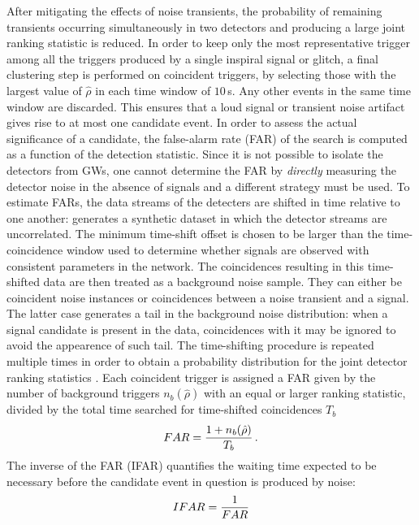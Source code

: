 \documentclass[binding=0.6cm, LaM]{sapthesis}
\begin{document}
	After mitigating the effects of noise transients, the probability of remaining transients 
	occurring simultaneously in two detectors and producing a large joint 
	ranking statistic is reduced.
	In order to keep only the most representative trigger among all the triggers produced by a single inspiral signal or glitch, 
	a final clustering step is performed on coincident triggers, 
	by selecting those with the largest value of $\hat \rho$ 
	in each time window of $10$\,s. 
	Any other events in the same time window are discarded. 
	This ensures that a loud signal or transient noise artifact gives rise to at most one candidate event.
	In order to assess the actual significance of a candidate, 
	the false-alarm rate (FAR) of the search is computed as a function of the detection statistic.
  	Since it is not possible to isolate the detectors from GWs, 
	one cannot determine the FAR by \emph{directly} measuring the detector noise in the absence of signals and a different strategy must be used.
 	To estimate FARs, the data streams of the detecters are shifted in time relative to one another: generates a synthetic dataset in which the detector streams are uncorrelated.  The minimum time-shift offset is chosen to be larger than the time-coincidence window used to determine whether signals are observed with consistent parameters in the network.
	The coincidences resulting in this time-shifted data are then treated as a background noise sample.  They can either be coincident noise instances or coincidences between a noise transient and a signal.  The latter case generates a tail in the background noise distribution: when a signal candidate is present in the data, coincidences with it may be ignored to avoid the appearence of such tail.
	The time-shifting procedure is repeated multiple times in order to obtain a probability distribution for the joint detector ranking statistics \cite{44}. 
	Each coincident trigger is assigned a FAR given by the number 
	of background triggers $n_b(\hat \rho)$ with an equal or larger ranking statistic, 
	divided by the total time searched for time-shifted coincidences $T_b$
        \begin{equation}
          FAR = {{1 + n_b(\hat \rho)} \over {T_b}}\,.
        \end{equation}
        The inverse of the FAR (IFAR) quantifies the waiting time expected to be necessary before the candidate event in question is produced by noise:
        \begin{equation}
          IFAR = {1 \over {FAR}}
        \end{equation}
\end{document}
